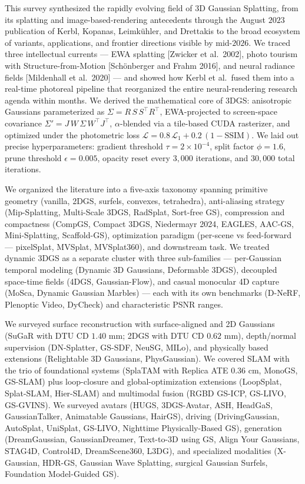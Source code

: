 This survey synthesized the rapidly evolving field of 3D Gaussian Splatting, from its splatting and image-based-rendering antecedents through the August \(2023\) publication of Kerbl, Kopanas, Leimkühler, and Drettakis to the broad ecosystem of variants, applications, and frontier directions visible by mid-\(2026\). We traced three intellectual currents --- EWA splatting {[}Zwicker et al.~2002{]}, photo tourism with Structure-from-Motion {[}Schönberger and Frahm 2016{]}, and neural radiance fields {[}Mildenhall et al.~2020{]} --- and showed how Kerbl et al.~fused them into a real-time photoreal pipeline that reorganized the entire neural-rendering research agenda within months. We derived the mathematical core of 3DGS: anisotropic Gaussians parameterized as \(\Sigma=R\,S\,S^{\top}R^{\top}\), EWA-projected to screen-space covariance \(\Sigma'=J\,W\,\Sigma\,W^{\top}J^{\top}\), \(\alpha\)-blended via a tile-based CUDA rasterizer, and optimized under the photometric loss \(\mathcal{L}=0.8\,\mathcal{L}_1 + 0.2\,(1-\mathrm{SSIM})\). We laid out precise hyperparameters: gradient threshold \(\tau=2{\times}10^{-4}\), split factor \(\phi=1.6\), prune threshold \(\epsilon=0.005\), opacity reset every \(3{,}000\) iterations, and \(30{,}000\) total iterations.

We organized the literature into a five-axis taxonomy spanning primitive geometry (vanilla, 2DGS, surfels, convexes, tetrahedra), anti-aliasing strategy (Mip-Splatting, Multi-Scale 3DGS, RadSplat, Sort-free GS), compression and compactness (CompGS, Compact 3DGS, Niedermayr 2024, EAGLES, AAC-GS, Mini-Splatting, Scaffold-GS), optimization paradigm (per-scene vs feed-forward --- pixelSplat, MVSplat, MVSplat360), and downstream task. We treated dynamic 3DGS as a separate cluster with three sub-families --- per-Gaussian temporal modeling (Dynamic 3D Gaussians, Deformable 3DGS), decoupled space-time fields (4DGS, Gaussian-Flow), and casual monocular 4D capture (MoSca, Dynamic Gaussian Marbles) --- each with its own benchmarks (D-NeRF, Plenoptic Video, DyCheck) and characteristic PSNR ranges.

We surveyed surface reconstruction with surface-aligned and 2D Gaussians (SuGaR with DTU CD \(1.40\) mm; 2DGS with DTU CD \(0.62\) mm), depth/normal supervision (DN-Splatter, GS-SDF, NeuSG, MILo), and physically based extensions (Relightable 3D Gaussians, PhysGaussian). We covered SLAM with the trio of foundational systems (SplaTAM with Replica ATE \(0.36\) cm, MonoGS, GS-SLAM) plus loop-closure and global-optimization extensions (LoopSplat, Splat-SLAM, Hier-SLAM) and multimodal fusion (RGBD GS-ICP, GS-LIVO, GS-GVINS). We surveyed avatars (HUGS, 3DGS-Avatar, ASH, HeadGaS, GaussianTalker, Animatable Gaussians, HairGS), driving (DrivingGaussian, AutoSplat, UniSplat, GS-LIVO, Nighttime Physically-Based GS), generation (DreamGaussian, GaussianDreamer, Text-to-3D using GS, Align Your Gaussians, STAG4D, Control4D, DreamScene360, L3DG), and specialized modalities (X-Gaussian, HDR-GS, Gaussian Wave Splatting, surgical Gaussian Surfels, Foundation Model-Guided GS).

